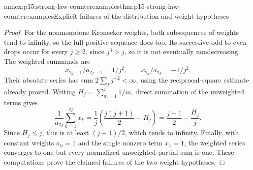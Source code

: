 \begin{annexitem}{annex:p15.strong-law-counterexamples}{thm:p15-strong-law-counterexamples}{Explicit failures of the distribution and weight hypotheses}
\begin{proof}
For the nonmonotone Kronecker weights, both subsequences of weights
tend to infinity, so the full positive sequence does too. Its successive
odd-to-even drops occur for every \(j\geq2\), since \(j^3>j\),
so it is not eventually nondecreasing. The weighted summands are
\[
 x_{2j-1}/a_{2j-1}=1/j^2,\qquad
 x_{2j}/a_{2j}=-1/j^2.
\]
Their absolute series has sum \(2\sum_jj^{-2}<\infty\), using
the reciprocal-square estimate already proved. Writing
\(H_j=\sum_{m=1}^j1/m\), direct summation of the unweighted terms
gives
\[
 \frac1{a_{2j}}\sum_{k=1}^{2j}x_k
   =\frac1j\left(\frac{j(j+1)}2-H_j\right)
   =\frac{j+1}{2}-\frac{H_j}{j}.
\]
Since \(H_j\leq j\), this is at least \((j-1)/2\), which
tends to infinity. Finally, with constant weights \(a_n=1\)
and the single nonzero term \(x_1=1\), the weighted series
converges to one but every normalized unweighted partial sum is one.
These computations prove the claimed failures of the two weight
hypotheses.
\end{proof}
\end{annexitem}
